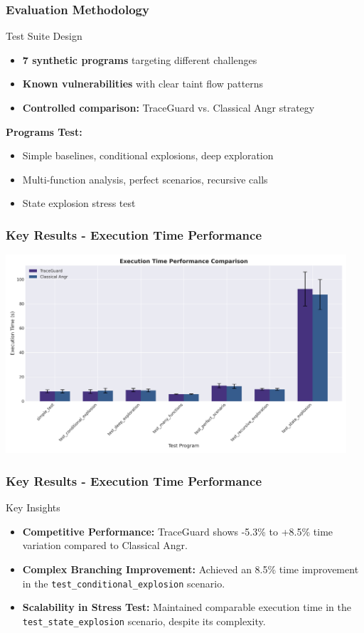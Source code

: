 \documentclass[aspectratio=169]{beamer}
\begin{document}
\begin{frame}
    \frametitle{Evaluation Methodology}
    \begin{implementation}{Test Suite Design}
        \begin{itemize}
            \item \textbf{7 synthetic programs} targeting different challenges
            \item \textbf{Known vulnerabilities} with clear taint flow patterns
            \item \textbf{Controlled comparison:} TraceGuard vs. Classical Angr strategy
        \end{itemize}
    \end{implementation}
    
    \textbf{Programs Test:}
    \begin{itemize}
        \item Simple baselines, conditional explosions, deep exploration
        \item Multi-function analysis, perfect scenarios, recursive calls
        \item State explosion stress test
    \end{itemize}
\end{frame}

\begin{frame}
    \frametitle{Key Results - Execution Time Performance}
    \centering
    \includegraphics[width=0.95\textwidth]{./pic/execution_time_performance.png}
\end{frame}

\begin{frame}
    \frametitle{Key Results - Execution Time Performance}
    \begin{evaluation}{Key Insights}
        \begin{itemize}
            \item \textbf{Competitive Performance:} TraceGuard shows -5.3\% to +8.5\% time variation compared to Classical Angr. 
            \item \textbf{Complex Branching Improvement:} Achieved an 8.5\% time improvement in the \texttt{test\_conditional\_explosion} scenario. 
            \item \textbf{Scalability in Stress Test:} Maintained comparable execution time in the \texttt{test\_state\_explosion} scenario, despite its complexity. 
        \end{itemize}
    \end{evaluation}
\end{frame}
\end{document}
